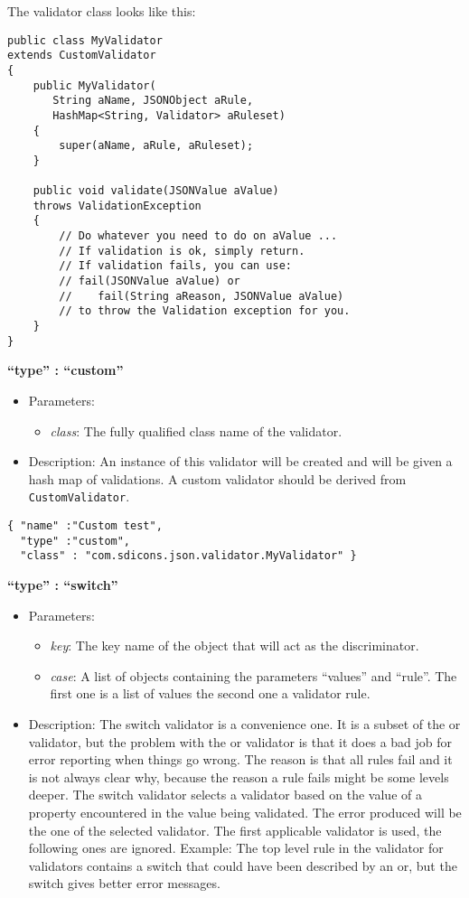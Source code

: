 \documentclass[a4paper]{article}
\newcommand{\ruledef}[3]{
\medskip
\textbf{#1}

\begin{itemize}
\setlength{\itemsep}{1pt}
\setlength{\parskip}{0pt}
\setlength{\parsep}{0pt}
   \item Parameters: #2
   \item Description: #3
\end{itemize}
}
\newcommand{\rulename}[1]{\textbf{``type'' : ``#1''}}
\newcommand{\param}[1]{\textsl{#1}:}
\begin{document}
The validator class looks like this:

\begin{lstlisting}
public class MyValidator
extends CustomValidator
{
    public MyValidator(
       String aName, JSONObject aRule,
       HashMap<String, Validator> aRuleset)
    {
        super(aName, aRule, aRuleset);
    }

    public void validate(JSONValue aValue) 
    throws ValidationException
    {
        // Do whatever you need to do on aValue ...
        // If validation is ok, simply return.
        // If validation fails, you can use:
        // fail(JSONValue aValue) or 
        //    fail(String aReason, JSONValue aValue)
        // to throw the Validation exception for you.
    }
}
\end{lstlisting}

\ruledef{\rulename{custom}}{\begin{itemize} \item \param{class} The fully qualified class name of the validator.\end{itemize}}{An instance of this validator will be created and will be given a hash map of validations.  A custom validator should be derived from \lstinline{CustomValidator}. }

\begin{lstlisting}
{ "name" :"Custom test",
  "type" :"custom",
  "class" : "com.sdicons.json.validator.MyValidator" }
\end{lstlisting}

\ruledef{\rulename{switch}}{\begin{itemize} \item \param{key} The key name of the object that will act as the discriminator. \item \param{case}  A list of objects containing the parameters ``values'' and ``rule''. The first one is a list of values the second one a validator rule. \end{itemize}}{ The switch validator is a convenience one. It is a subset of the or validator, but the problem with the or validator is that it does a bad job for error reporting when things go wrong. The reason is that all rules fail and it is not always clear why, because the reason a rule fails might be some levels deeper. The switch validator selects a validator based on the value of  a property encountered in the value being validated. The error produced will be the one of the selected validator.  The first applicable validator is used, the following ones are ignored.
Example: The top level rule in the validator for validators contains a switch that could have been described by an or, but the switch gives better error messages.}
\end{document}
